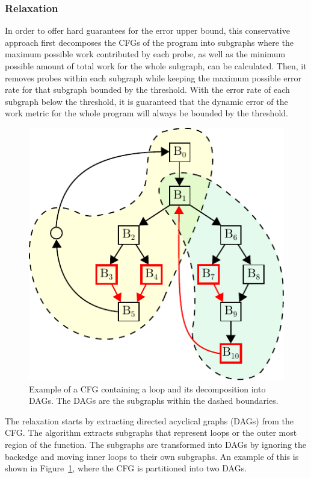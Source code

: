     \subsubsection{\WCRelaxTitle Relaxation}

    In order to offer hard guarantees for the error upper bound, this conservative approach first decomposes the CFGs of the program into
    subgraphs where the maximum possible work contributed by each probe, as well as the minimum possible amount of total work for the whole
    subgraph, can be calculated. Then, it removes probes within each subgraph while keeping the maximum possible error rate for that
    subgraph bounded by the threshold. With the error rate of each subgraph below the threshold, it is guaranteed that the dynamic error of
    the work metric for the whole program will always be bounded by the threshold.

    \begin{figure}[t]
      \centering
      \includegraphics[scale=0.8]{figs/cfg-relax-example.pdf}
      \caption{Example of a CFG containing a loop and its decomposition into DAGs.
               The DAGs are the subgraphs within the dashed boundaries.}
      \vspace{-4mm}
      \label{fig:cfg-relax-example}
    \end{figure}

    The \WCRelaxLower relaxation starts by extracting directed acyclical graphs (DAGs) from the CFG. The algorithm extracts subgraphs that
    represent loops or the outer most region of the function. The subgraphs are transformed into DAGs by ignoring the backedge and moving
    inner loops to their own subgraphs. An example of this is shown in Figure~\ref{fig:cfg-relax-example}, where the CFG is partitioned
    into two DAGs.

